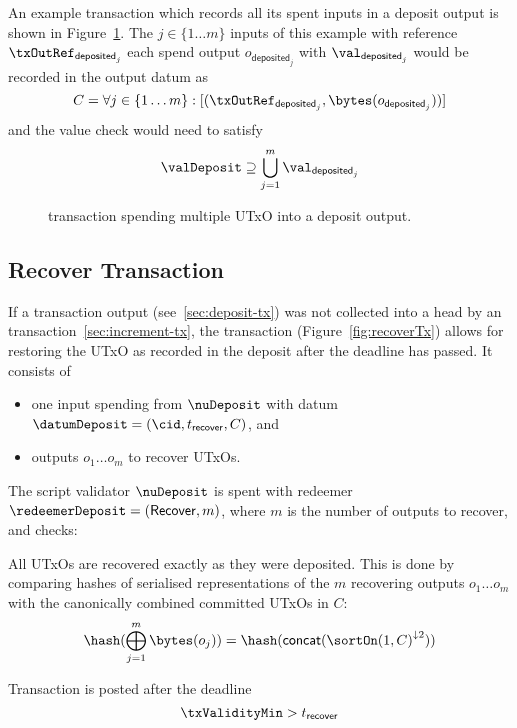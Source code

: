 \noindent An example transaction which records all its spent inputs in a deposit output is
shown in Figure~\ref{fig:depositTx}. The $j \in \{1 \dots m\}$ inputs of this example with reference $\txOutRef_{\mathsf{deposited}_{j}}$ each spend output $o_{\mathsf{deposited}_{j}}$ with $\val_{\mathsf{deposited}_{j}}$ would be recorded in the output datum as
\[
  C = \forall j \in \{1 \dots m\} : [(\txOutRef_{\mathsf{deposited}_{j}},\bytes(o_{\mathsf{deposited}_{j}}))]
\]
\noindent and the value check would need to satisfy
\[
  \valDeposit \supseteq \bigcup_{j=1}^{m} \val_{\mathsf{deposited}_{j}}
\]
\begin{figure}
  \centering
  
  \caption{\mtxDeposit{} transaction spending multiple UTxO into a deposit
	output.}\label{fig:depositTx}
\end{figure}

\subsection{Recover Transaction}\label{sec:recover-tx}

\noindent If a \mtxDeposit{} transaction output (see~\ref{sec:deposit-tx}) was
not collected into a head by an \mtxIncrement{}
transaction~\ref{sec:increment-tx}, the \mtxRecover{} transaction
(Figure~\ref{fig:recoverTx}) allows for restoring the UTxO as recorded in the
deposit after the deadline has passed. It consists of
\begin{itemize}
  \item one input spending from $\nuDeposit$ with datum $\datumDeposit = (\cid, t_{\mathsf{recover}}, C)$, and
  \item outputs $o_{1} \dots o_{m}$ to recover UTxOs.
\end{itemize}

\noindent The script validator $\nuDeposit$ is spent with redeemer
$\redeemerDeposit = (\mathsf{Recover}, m)$, where $m$ is the number of outputs
to recover, and checks:
\begin{menumerate}
  \item All UTxOs are recovered exactly as they were deposited. This is done by
  comparing hashes of serialised representations of the $m$ recovering outputs
  $o_{1} \dots o_{m}$ with the canonically combined committed UTxOs in $C$:
  \[
    \hash(\bigoplus_{j=1}^{m} \bytes(o_{j})) = \hash(\mathsf{concat}({\sortOn(1, C)}^{\downarrow2}))
  \]
  \item Transaction is posted after the deadline
  \[
    \txValidityMin > t_{\mathsf{recover}}
  \]
\end{menumerate}

